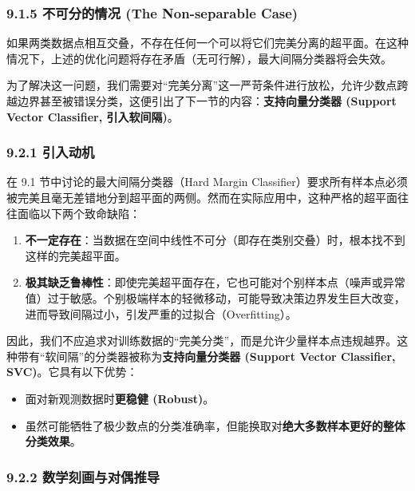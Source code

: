 \documentclass[UTF8]{ctexart}
\numberwithin{equation}{section}
\begin{document}
\subsubsection{9.1.5 不可分的情况 (The Non-separable Case)}

如果两类数据点相互交叠，不存在任何一个可以将它们完美分离的超平面。在这种情况下，上述的优化问题将存在矛盾（无可行解），最大间隔分类器将会失效。

为了解决这一问题，我们需要对“完美分离”这一严苛条件进行放松，允许少数点跨越边界甚至被错误分类，这便引出了下一节的内容：\textbf{支持向量分类器 (Support Vector Classifier, 引入软间隔)}。





\subsubsection{9.2.1 引入动机}

在 9.1 节中讨论的最大间隔分类器（Hard Margin Classifier）要求所有样本点必须被完美且毫无差错地分到超平面的两侧。然而在实际应用中，这种严格的超平面往往面临以下两个致命缺陷：
\begin{enumerate}
    \item \textbf{不一定存在}：当数据在空间中线性不可分（即存在类别交叠）时，根本找不到这样的完美超平面。
    \item \textbf{极其缺乏鲁棒性}：即使完美超平面存在，它也可能对个别样本点（噪声或异常值）过于敏感。个别极端样本的轻微移动，可能导致决策边界发生巨大改变，进而导致间隔过小，引发严重的过拟合（Overfitting）。
\end{enumerate}

因此，我们不应追求对训练数据的“完美分类”，而是允许少量样本点违规越界。这种带有“软间隔”的分类器被称为\textbf{支持向量分类器 (Support Vector Classifier, SVC)}。它具有以下优势：
\begin{itemize}
    \item 面对新观测数据时\textbf{更稳健 (Robust)}。
    \item 虽然可能牺牲了极少数点的分类准确率，但能换取对\textbf{绝大多数样本更好的整体分类效果}。
\end{itemize}

\vspace{1em}

\subsubsection{9.2.2 数学刻画与对偶推导}
\end{document}

